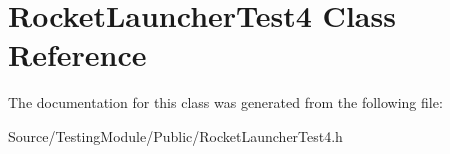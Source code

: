 \hypertarget{class_rocket_launcher_test4}{}\section{Rocket\+Launcher\+Test4 Class Reference}
\label{class_rocket_launcher_test4}


The documentation for this class was generated from the following file\+:\begin{DoxyCompactItemize}
\item 
Source/\+Testing\+Module/\+Public/Rocket\+Launcher\+Test4.\+h\end{DoxyCompactItemize}
